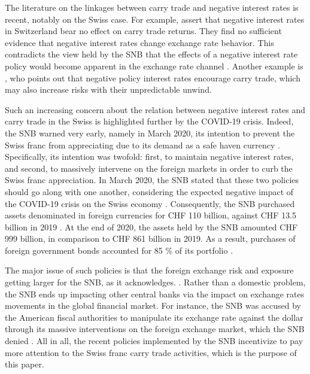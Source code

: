 \documentclass[a4paper, twoside]{templates/ociamthesis}
\begin{document}
The literature on the linkages between carry trade and negative interest rates is recent, notably on the Swiss case. For example, \textcite{hameed2018} assert that negative interest rates in Switzerland bear no effect on carry trade returns. They find no sufficient evidence that negative interest rates change exchange rate behavior. This contradicts the view held by the SNB that the effects of a negative interest rate policy would become apparent in the exchange rate channel \autocite{jordan2016}. Another example is \textcite{kay2018}, who points out that negative policy interest rates encourage carry trade, which may also increase risks with their unpredictable unwind.

Such an increasing concern about the relation between negative interest rates and carry trade in the Swiss is highlighted further by the COVID-19 crisis. Indeed, the SNB warned very early, namely in March 2020, its intention to prevent the Swiss franc from appreciating due to its demand as a safe haven currency \autocite{swissnationalbank2020}. Specifically, its intention was twofold: first, to maintain negative interest rates, and second, to massively intervene on the foreign markets in order to curb the Swiss franc appreciation. In March 2020, the SNB stated that these two policies should go along with one another, considering the expected negative impact of the COVID-19 crisis on the Swiss economy \autocite[ 46]{swissnationalbank2020}. Consequently, the SNB purchased assets denominated in foreign currencies for CHF 110 billion, against CHF 13.5 billion in 2019 \autocite[ 50]{swissnationalbank2020}. At the end of 2020, the assets held by the SNB amounted CHF 999 billion, in comparison to CHF 861 billion in 2019. As a result, purchases of foreign government bonds accounted for 85 \% of its portfolio \autocite[ 16]{swissnationalbank2020}.

The major issue of such policies is that the foreign exchange risk and exposure getting larger for the SNB, as it acknowledges. \autocite[ 16]{swissnationalbank2020}. Rather than a domestic problem, the SNB ends up impacting other central banks via the impact on exchange rates movements in the global financial market. For instance, the SNB was accused by the American fiscal authorities to manipulate its exchange rate against the dollar through its massive interventions on the foreign exchange market, which the SNB denied \autocite[ 21]{swissnationalbank2020}. All in all, the recent policies implemented by the SNB incentivize to pay more attention to the Swiss franc carry trade activities, which is the purpose of this paper.
\end{document}
